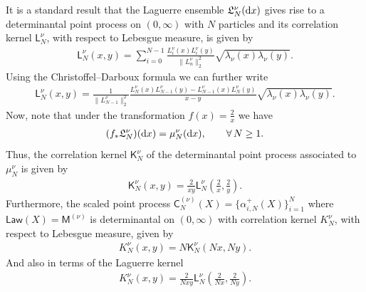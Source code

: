 \documentclass[pdftex]{sigma}
\numberwithin{equation}{section}
\begin{document}
It is a standard result that the Laguerre ensemble $\mathfrak{L}_N^{\nu}({\rm d}x)$ gives rise to a determinantal point process on $(0,\infty)$ with $N$ particles and its correlation kernel $\mathsf{L}_{N}^{\nu}$, with respect to Lebesgue measure, is given by
\begin{gather*}
\mathsf{L}_{N}^{\nu}(x,y)=\sum_{i=0}^{N-1}\frac{L_i^{\nu}(x)L_i^{\nu}(y)}{\|L_n^{\nu}\|_2^2}\sqrt{\lambda_\nu(x)\lambda_\nu(y)}.
\end{gather*}
Using the Christoffel--Darboux formula we can further write
\begin{gather*}
\mathsf{L}_{N}^{\nu}(x,y)=\frac{1}{\|L_{N-1}^{\nu}\|_2^2}\frac{L_{N}^{\nu}(x)L_{N-1}^{\nu}(y)-L_{N-1}^{\nu}(x)L_{N}^{\nu}(y)}{x-y}\sqrt{\lambda_\nu(x)\lambda_\nu(y)}.
\end{gather*}
Now, note that under the transformation $f(x)=\frac{2}{x}$ we have
\begin{gather*}
(f_*\mathfrak{L}_N^{\nu})({\rm d}x)=\mu_N^{\nu}({\rm d}x), \qquad \forall\, N \ge 1.
\end{gather*}
Thus, the correlation kernel $\mathsf{K}_N^{\nu}$ of the determinantal point process associated to $\mu_N^{\nu}$ is given by
\begin{gather*}
\mathsf{K}_N^{\nu}(x,y)=\frac{2}{xy}\mathsf{L}_N^{\nu}\left(\frac{2}{x},\frac{2}{y}\right).
\end{gather*}
Furthermore, the scaled point process $\mathsf{C}_N^{(\nu)}(X)=\{\alpha_{i,N}^+(X) \}_{i=1}^N$ where $\mathsf{Law}(X)=\mathsf{M}^{(\nu)}$ is deter\-minantal on $(0,\infty)$ with correlation kernel $K_N^{\nu}$, with respect to Lebesgue measure, given by
\begin{gather*}
K_N^{\nu}(x,y)=N\mathsf{K}_N^{\nu}(Nx,Ny).
\end{gather*}
And also in terms of the Laguerre kernel
\begin{gather}\label{KernelRelation}
K_N^{\nu}(x,y)=\frac{2}{Nxy}\mathsf{L}_N^{\nu}\left(\frac{2}{Nx},\frac{2}{Ny}\right).
\end{gather}
\end{document}
